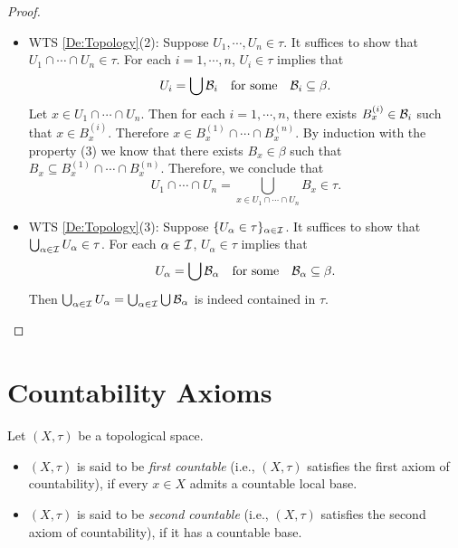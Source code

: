 \documentclass[screen,single]{techreport}
\numberwithin{equation}{section}
\begin{document}
\begin{proof}
\begin{itemize}
\begin{itemize}
			\item WTS \cref{De:Topology}(2):
			Suppose $U_1,\cdots,U_n \in \tau$.
			It suffices to show that $U_1 \cap \cdots \cap U_n \in \tau$.
			For each $i=1,\cdots,n$, $U_i \in \tau$ implies that
			\[
			U_i = \bigcup \mathcal{B}_i \quad \text{for some} \quad \mathcal{B}_i \subseteq \beta.
			\]
			Let $x \in U_1 \cap \cdots \cap U_n$.
			Then for each $i=1,\cdots,n$, there exists $B_x^{(i)} \in \mathcal{B}_i$ such that $x \in B_x^{(i)}$.
			Therefore $x \in B_x^{(1)} \cap \cdots \cap B_x^{(n)}$.
			By induction with the property (3) we know that there exists $B_x \in \beta$ such that $B_x \subseteq B_x^{(1)} \cap \cdots \cap B_x^{(n)}$.
			Therefore, we conclude that
			\[
			U_1 \cap \cdots \cap U_n = \bigcup_{x \in U_1 \cap \cdots \cap U_n} B_x \in \tau.
			\]
			
			\item WTS \cref{De:Topology}(3):
			Suppose $\{U_\alpha \in \tau\}_{\alpha \in \mathcal{I}}$.
			It suffices to show that $\bigcup_{\alpha \in \mathcal{I}} U_\alpha \in \tau$.
			For each $\alpha \in \mathcal{I}$, $U_\alpha \in \tau$ implies that
			\[
			U_\alpha = \bigcup \mathcal{B}_\alpha \quad \text{for some} \quad \mathcal{B}_\alpha \subseteq \beta.
			\]
			Then $\bigcup_{\alpha \in \mathcal{I}} U_\alpha = \bigcup_{\alpha \in \mathcal{I}} \bigcup \mathcal{B}_\alpha$ is indeed contained in $\tau$.
		\end{itemize}
	\end{itemize}
\end{proof}

\section{Countability Axioms}

\begin{definition}\label{De:AxiomsOfCountability}
	Let $(X,\tau)$ be a topological space.
	\begin{itemize}
		\item $(X,\tau)$ is said to be \emph{first countable} (i.e., $(X,\tau)$ satisfies the first axiom of countability), if every $x \in X$ admits a countable local base.
		\item $(X,\tau)$ is said to be \emph{second countable} (i.e., $(X,\tau)$ satisfies the second axiom of countability), if it has a countable base.
	\end{itemize}
\end{definition}
\end{document}

